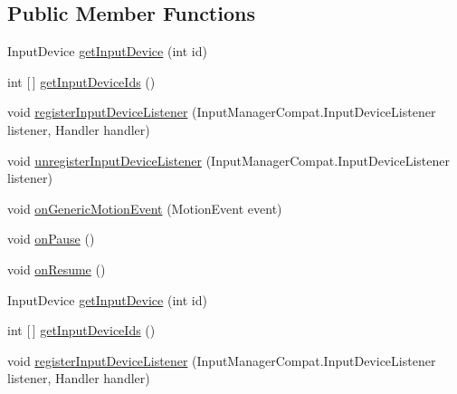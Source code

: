 \subsection*{Public Member Functions}
\begin{DoxyCompactItemize}
\item 
Input\+Device \hyperlink{interfaceorg_1_1cocos2dx_1_1lib_1_1inputmanagercompat_1_1InputManagerCompat_afbfb5229b12433c81ddbf9e0315cd986}{get\+Input\+Device} (int id)
\item 
int \mbox{[}$\,$\mbox{]} \hyperlink{interfaceorg_1_1cocos2dx_1_1lib_1_1inputmanagercompat_1_1InputManagerCompat_a1601bfbe1b4871a935d49a2a4094e5ac}{get\+Input\+Device\+Ids} ()
\item 
void \hyperlink{interfaceorg_1_1cocos2dx_1_1lib_1_1inputmanagercompat_1_1InputManagerCompat_af505b8f5543cd482c3d3e4b316732a78}{register\+Input\+Device\+Listener} (Input\+Manager\+Compat.\+Input\+Device\+Listener listener, Handler handler)
\item 
void \hyperlink{interfaceorg_1_1cocos2dx_1_1lib_1_1inputmanagercompat_1_1InputManagerCompat_a3f2a57f29caa18f703e3d38f7f080ba9}{unregister\+Input\+Device\+Listener} (Input\+Manager\+Compat.\+Input\+Device\+Listener listener)
\item 
void \hyperlink{interfaceorg_1_1cocos2dx_1_1lib_1_1inputmanagercompat_1_1InputManagerCompat_a813a0308659d716c9503d44ccb48ebb1}{on\+Generic\+Motion\+Event} (Motion\+Event event)
\item 
void \hyperlink{interfaceorg_1_1cocos2dx_1_1lib_1_1inputmanagercompat_1_1InputManagerCompat_a75e607a2bc756ca935665236f995dd0e}{on\+Pause} ()
\item 
void \hyperlink{interfaceorg_1_1cocos2dx_1_1lib_1_1inputmanagercompat_1_1InputManagerCompat_a8ce6170ffd23cf2a18374c271939ac1e}{on\+Resume} ()
\item 
Input\+Device \hyperlink{interfaceorg_1_1cocos2dx_1_1lib_1_1inputmanagercompat_1_1InputManagerCompat_afbfb5229b12433c81ddbf9e0315cd986}{get\+Input\+Device} (int id)
\item 
int \mbox{[}$\,$\mbox{]} \hyperlink{interfaceorg_1_1cocos2dx_1_1lib_1_1inputmanagercompat_1_1InputManagerCompat_a1601bfbe1b4871a935d49a2a4094e5ac}{get\+Input\+Device\+Ids} ()
\item 
void \hyperlink{interfaceorg_1_1cocos2dx_1_1lib_1_1inputmanagercompat_1_1InputManagerCompat_af505b8f5543cd482c3d3e4b316732a78}{register\+Input\+Device\+Listener} (Input\+Manager\+Compat.\+Input\+Device\+Listener listener, Handler handler)
\item 

\end{DoxyCompactItemize}
